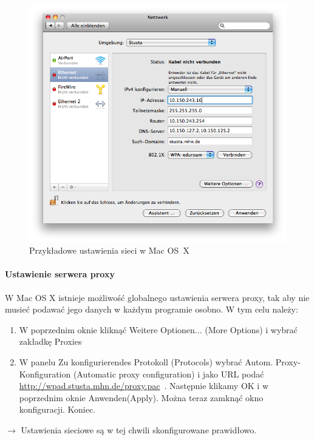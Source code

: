 \documentclass[a4paper,12pt]{scrartcl}
\begin{document}
\begin{enumerate}
\begin{figure}[h!]
\begin{minipage}[c]{0.38\linewidth}
        \end{minipage}
        \begin{minipage}[c]{0.60\linewidth}
          \centering
          \includegraphics[width=\linewidth,keepaspectratio]{Bilder/IP_MAC}
          \caption{Przykładowe ustawienia sieci w Mac OS~X}
        \end{minipage}
      \end{figure}
\end{enumerate}

\paragraph*{Ustawienie serwera proxy}
W Mac OS X istnieje możliwość globalnego ustawienia serwera proxy, tak aby nie musieć podawać jego danych w każdym programie osobno. W tym celu należy:
\begin{enumerate}
    \item W poprzednim oknie kliknąć Weitere Optionen... (More Options) i wybrać zakładkę Proxies
    \item W panelu Zu konfigurierendes Protokoll (Protocols) wybrać Autom. Proxy-Konfiguration (Automatic proxy configuration) i jako URL podać \url{http://wpad.stusta.mhn.de/proxy.pac}\ . Następnie klikamy OK i w poprzednim oknie Anwenden(Apply). Można teraz zamknąć okno konfiguracji. Koniec.
\end{enumerate}
$\rightarrow$ Ustawienia sieciowe są w tej chwili skonfigurowane prawidłowo. 
\end{document}
